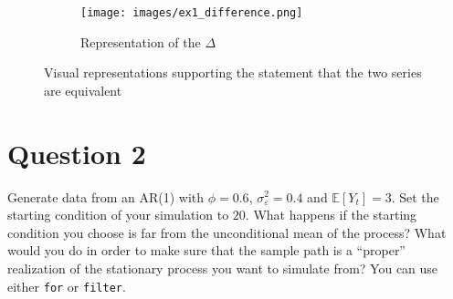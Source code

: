 \documentclass[dvipsnames,11pt]{article}
\begin{document}
\begin{enumerate}[label=\alph*.]
\begin{solution}
\begin{figure}[h]
\begin{subfigure}[b]{0.99\textwidth}
                     \end{subfigure}
                     \hfill
                     \begin{subfigure}[b]{0.99\textwidth}
                         \centering
                         \texttt{[image: images/ex1\_difference.png]}
                         \caption{Representation of the \(\Delta\)}
                         \label{fig:ex1_difference}
                     \end{subfigure}
                        \label{fig:ex_1c}
                        \caption{Visual representations supporting the statement that the two series are equivalent}
                \end{figure}
        
            \end{solution}  

    \end{enumerate}

\section*{Question 2}
\setcounter{section}{2}

    Generate data from an AR(1) with $\phi=0.6$, $\sigma_\varepsilon^2=0.4$ and $\mathbb{E}[Y_t]=3$. Set the starting condition of your simulation to $20$. What happens if the starting condition you choose is far from the unconditional mean of the process? What would you do in order to make sure that the sample path is a ``proper'' realization of the stationary process you want to simulate from? You can use either \texttt{for} or \texttt{filter}.
\end{document}
